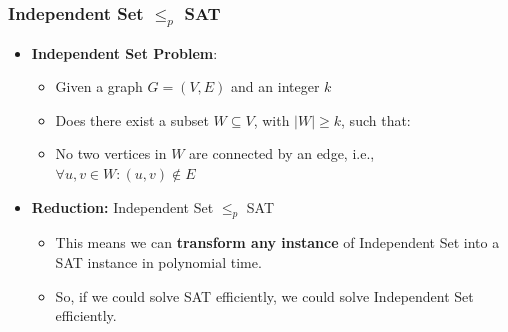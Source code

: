 \begin{frame}
    \frametitle{Independent Set $\leq_p$ SAT}

    \begin{itemize}
        \item \textbf{Independent Set Problem}:
        \begin{itemize}
            \item Given a graph $G = (V, E)$ and an integer $k$
            \item Does there exist a subset $W \subseteq V$, with $|W| \geq k$, such that:
            \item No two vertices in $W$ are connected by an edge, i.e., $\forall u,v \in W: (u,v) \notin E$
        \end{itemize}

        \item \textbf{Reduction:} Independent Set $\leq_p$ SAT
        \begin{itemize}
            \item This means we can \textbf{transform any instance} of Independent Set into a SAT instance in polynomial time.
            \item So, if we could solve SAT efficiently, we could solve Independent Set efficiently.
        \end{itemize}
    \end{itemize}
\end{frame}
